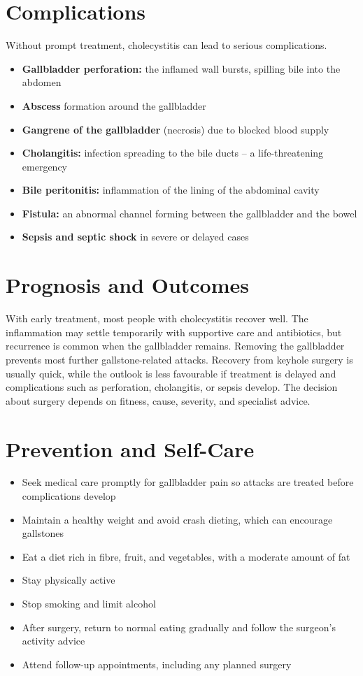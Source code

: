 \section*{Complications}
Without prompt treatment, cholecystitis can lead to serious complications.

\begin{itemize}
    \item \textbf{Gallbladder perforation:} the inflamed wall bursts, spilling bile into the abdomen
    \item \textbf{Abscess} formation around the gallbladder
    \item \textbf{Gangrene of the gallbladder} (necrosis) due to blocked blood supply
    \item \textbf{Cholangitis:} infection spreading to the bile ducts -- a life-threatening emergency
    \item \textbf{Bile peritonitis:} inflammation of the lining of the abdominal cavity
    \item \textbf{Fistula:} an abnormal channel forming between the gallbladder and the bowel
    \item \textbf{Sepsis and septic shock} in severe or delayed cases
\end{itemize}

\section*{Prognosis and Outcomes}
With early treatment, most people with cholecystitis recover well. The inflammation may settle temporarily with supportive care and antibiotics, but recurrence is common when the gallbladder remains. Removing the gallbladder prevents most further gallstone-related attacks. Recovery from keyhole surgery is usually quick, while the outlook is less favourable if treatment is delayed and complications such as perforation, cholangitis, or sepsis develop. The decision about surgery depends on fitness, cause, severity, and specialist advice.

\section*{Prevention and Self-Care}
\begin{itemize}
    \item Seek medical care promptly for gallbladder pain so attacks are treated before complications develop
    \item Maintain a healthy weight and avoid crash dieting, which can encourage gallstones
    \item Eat a diet rich in fibre, fruit, and vegetables, with a moderate amount of fat
    \item Stay physically active
    \item Stop smoking and limit alcohol
    \item After surgery, return to normal eating gradually and follow the surgeon's activity advice
    \item Attend follow-up appointments, including any planned surgery
\end{itemize}

